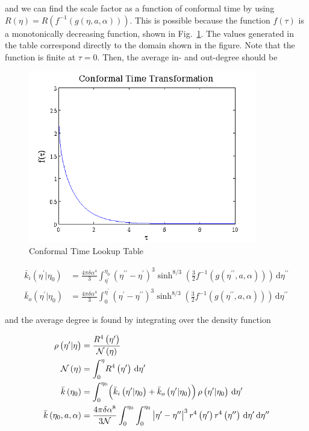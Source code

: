 \documentclass[preprint,notitlepage,amsmath,amssymb,floatfix]{revtex4-1}
\begin{document}
\noindent and we can find the scale factor as a function of conformal time by using $R\left(\eta\right) = R\left(f^{-1}\left(g\left(\eta, a, \alpha\right)\right)\right)$.
This is possible because the function $f\left(\tau\right)$ is a monotonically decreasing function, shown in Fig.~\ref{fig:f_tau_tau}.
The values generated in the table correspond directly to the domain shown in the figure.
Note that the function is finite at $\tau = 0$.
Then, the average in- and out-degree should be

\begin{figure}
\includegraphics[width=10cm]{figures/ctuc.png}
\caption{Conformal Time Lookup Table}
\label{fig:f_tau_tau}
\centering
\end{figure}

\begin{align}
\bar{k}_i\left(\eta^\prime|\eta_0\right) &= \frac{4\pi\delta\alpha^4}{3}\int_{\eta^\prime}^{\eta_0}\!\left(\eta^{\prime\prime}-\eta^\prime\right)^3\sinh^{8/3}\left(\frac{3}{2}f^{-1}\left(g\left(\eta^{\prime\prime}, a, \alpha\right)\right)\right)\,\mathrm d\eta^{\prime\prime} \\
\bar{k}_o\left(\eta^\prime|\eta_0\right) &= \frac{4\pi\delta\alpha^4}{3}\int_0^{\eta^\prime}\!\left(\eta^\prime-\eta^{\prime\prime}\right)^3\sinh^{8/3}\left(\frac{3}{2}f^{-1}\left(g\left(\eta^{\prime\prime}, a, \alpha\right)\right)\right)\,\mathrm d\eta^{\prime\prime}
\end{align}

\noindent and the average degree is found by integrating over the density function

\begin{align}
\rho\left(\eta^\prime|\eta\right) &= \frac{R^4\left(\eta^\prime\right)}{\mathcal{N}\left(\eta\right)} \\
\mathcal{N}\left(\eta\right) &= \int_0^\eta\!R^4\left(\eta^\prime\right)\,\mathrm d\eta^\prime \\
\bar{k}\left(\eta_0\right) &= \int_0^{\eta_0}\!\left(\bar{k}_i\left(\eta^\prime|\eta_0\right) + \bar{k}_o\left(\eta^\prime|\eta_0\right)\right)\rho\left(\eta^\prime|\eta_0\right)\,\mathrm d\eta^\prime \\
\bar{k}\left(\eta_0,a,\alpha\right) &= \frac{4\pi\delta\alpha^8}{3\mathcal{N}}\int_0^{\eta_0}\int_0^{\eta_0}\,\abs{\eta^\prime - \eta^{\prime\prime}}^3 r^4\left(\eta^\prime\right)r^4\left(\eta^{\prime\prime}\right)\,\mathrm d\eta^\prime\,\mathrm d\eta^{\prime\prime} \label{eq:alt_avg_deg}
\end{align}
\end{document}
